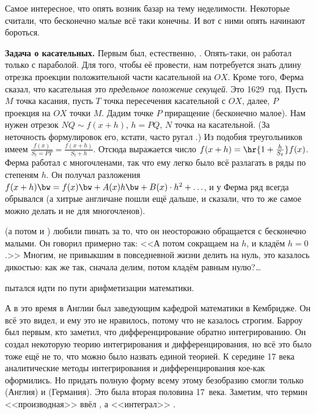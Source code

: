 \documentclass[a4paper,oneside,fleqn,10pt]{article}
\newcommand{\cpic}[1]{$$\epsfbox{pictures.#1}$$}
\begin{document}
Самое интересное, что опять возник базар на тему неделимости.
Некоторые считали, что бесконечно малые всё таки конечны.
И вот с ними опять начинают бороться.

\textbf{Задача о касательных.} Первым был, естественно, .
Опять-таки, он работал только с параболой. Для того, чтобы её провести,
нам потребуется знать длину отрезка проекции положительной части касательной на $OX$.
Кроме того, Ферма сказал, что касательная это \emph{предельное положение секущей}.
Это 1629~год.
Пусть $M$ точка касания, пусть $T$ точка пересечения касательной с $OX$,
далее, $P$ проекция на $OX$ точки $M$. Дадим точке $P$ приращение (бесконечно малое).
Нам нужен отрезок $NQ \sim f(x +h)$, $h = PQ$, $N$ точка на касательной.
(За неточность формулировок его, кстати, часто ругал .)
Из подобия треугольников имеем $\frac{f(x)}{S_t = PT} = \frac{f(x+h)}{S_t + h}$.
Отсюда выражается число $f(x+h) = \hr{1 + \frac{h}{S_t}}f(x)$.
Ферма работал с многочленами, так что ему легко было всё разлагать в ряды
по степеням $h$.
Он получал разложения $f(x+h) \bw= f(x) \bw+ A(x) h \bw+ B(x)\cdot h^2 +\ldots$, и у Ферма ряд всегда
обрывался (а хитрые англичане пошли ещё дальше, и сказали, что то же самое можно делать и не для многочленов).

 (а потом и ) любили пинать за то, что он неосторожно обращается с бесконечно малыми.
Он говорил примерно так: <<А потом сокращаем на $h$, и кладём $h = 0$.>> Многим, не привыкшим в повседневной
жизни делить на нуль, это казалось дикостью: как же
так, сначала делим, потом кладём равным нулю?\ldots

 пытался идти по пути арифметизации математики.

А в это время в Англии  был заведующим кафедрой математики
в Кембридже. Он всё это видел, и ему это не нравилось, потому что не казалось строгим.
Барроу был первым, кто заметил, что дифференцирование обратно интегрированию.
Он создал некоторую теорию интегрирования и дифференцирования, но всё это было тоже
ещё не то, что можно было назвать единой теорией.
К середине 17 века аналитические методы интегрирования и дифференцирования кое-как оформились.
Но придать полную форму всему этому безобразию смогли только  (Англия) и
 (Германия). Это была вторая половина 17~века.
Заметим, что термин <<производная>> ввёл , а <<интеграл>> .
\end{document}

